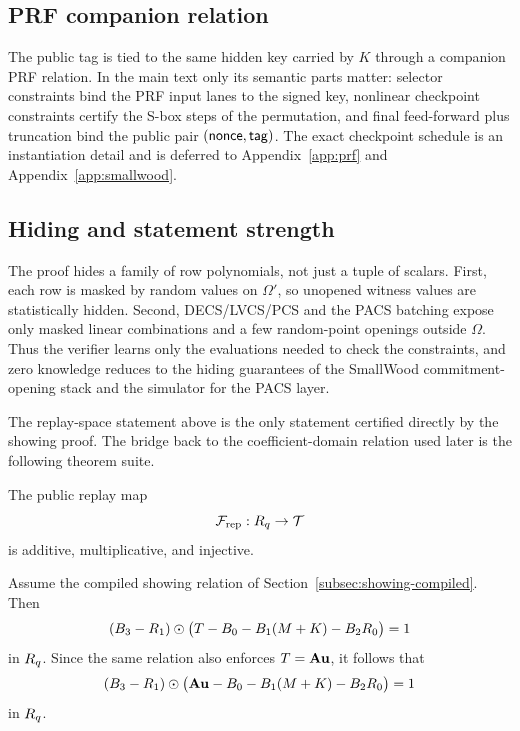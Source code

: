 \subsection{PRF companion relation}
\label{subsec:prf-checkpointed}
\label{subsec:prf-constraints}
The public tag is tied to the same hidden key carried by \(K\) through a companion PRF relation. In the main text only its semantic parts matter: selector constraints bind the PRF input lanes to the signed key, nonlinear checkpoint constraints certify the S-box steps of the permutation, and final feed-forward plus truncation bind the public pair \((\mathsf{nonce},\mathsf{tag})\). The exact checkpoint schedule is an instantiation detail and is deferred to Appendix~\ref{app:prf} and Appendix~\ref{app:smallwood}.

\subsection{Hiding and statement strength}
\label{subsec:statement-strength}
The proof hides a family of row polynomials, not just a tuple of scalars. First, each row is masked by random values on \(\Omega'\), so unopened witness values are statistically hidden. Second, DECS/LVCS/PCS and the PACS batching expose only masked linear combinations and a few random-point openings outside \(\Omega\). Thus the verifier learns only the evaluations needed to check the constraints, and zero knowledge reduces to the hiding guarantees of the SmallWood commitment-opening stack and the simulator for the PACS layer.

The replay-space statement above is the only statement certified directly by the showing proof. The bridge back to the coefficient-domain relation used later is the following theorem suite.

\begin{lemma}\label{lem:replay-transform}
The public replay map
\[
\mathcal F_{\mathrm{rep}}:R_q\to\mathcal T
\]
is additive, multiplicative, and injective.
\end{lemma}

\begin{lemma}\label{lem:showing-to-cleared}
Assume the compiled showing relation of Section~\ref{subsec:showing-compiled}. Then
\[
(B_3-R_1)\odot\bigl(T-B_0-B_1(M+K)-B_2R_0\bigr)=1
\]
in \(R_q\). Since the same relation also enforces \(T=\mathbf{A}\mathbf{u}\), it follows that
\[
(B_3-R_1)\odot\bigl(\mathbf{A}\mathbf{u}-B_0-B_1(M+K)-B_2R_0\bigr)=1
\]
in \(R_q\).
\end{lemma}


